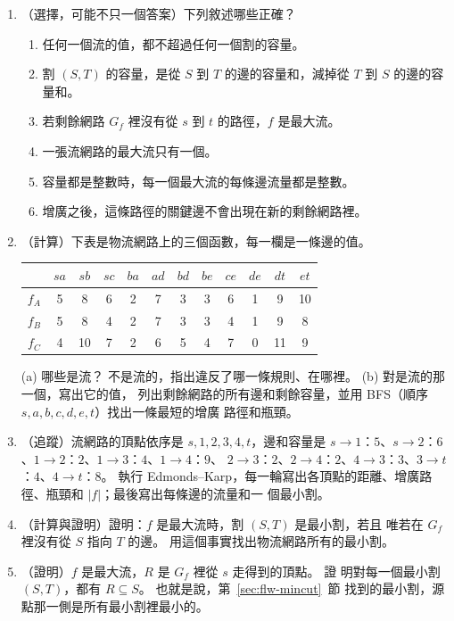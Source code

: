 \begin{enumerate}
\item \label{q:flw-tf}（選擇，可能不只一個答案）下列敘述哪些正確？
\begin{enumerate}
\item 任何一個流的值，都不超過任何一個割的容量。
\item 割 $(S, T)$ 的容量，是從 $S$ 到 $T$ 的邊的容量和，減掉從 $T$ 到 $S$ 的邊的容量和。
\item 若剩餘網路 $G_f$ 裡沒有從 $s$ 到 $t$ 的路徑，$f$ 是最大流。
\item 一張流網路的最大流只有一個。
\item 容量都是整數時，每一個最大流的每條邊流量都是整數。
\item 增廣之後，這條路徑的關鍵邊不會出現在新的剩餘網路裡。
\end{enumerate}

\item \label{q:flw-check}（計算）下表是物流網路上的三個函數，每一欄是一條邊的值。
\begin{center}
\small
\begin{tabular}{c|ccccccccccc}
 & $sa$ & $sb$ & $sc$ & $ba$ & $ad$ & $bd$ & $be$ & $ce$ & $de$ & $dt$ & $et$ \\
\hline
$f_A$ & 5 & 8 & 6 & 2 & 7 & 3 & 3 & 6 & 1 & 9 & 10 \\
$f_B$ & 5 & 8 & 4 & 2 & 7 & 3 & 3 & 4 & 1 & 9 & 8 \\
$f_C$ & 4 & 10 & 7 & 2 & 6 & 5 & 4 & 7 & 0 & 11 & 9 \\
\end{tabular}
\end{center}
(a) 哪些是流？ 不是流的，指出違反了哪一條規則、在哪裡。 (b) 對是流的那一個，寫出它的值，
列出剩餘網路的所有邊和剩餘容量，並用 BFS（順序 $s, a, b, c, d, e, t$）找出一條最短的增廣
路徑和瓶頸。

\item \label{q:flw-trace}（追蹤）流網路的頂點依序是 $s, 1, 2, 3, 4, t$，邊和容量是
$s \to 1$：$5$、$s \to 2$：$6$、$1 \to 2$：$2$、$1 \to 3$：$4$、$1 \to 4$：$9$、
$2 \to 3$：$2$、$2 \to 4$：$2$、$4 \to 3$：$3$、$3 \to t$：$4$、$4 \to t$：$8$。 執行
Edmonds--Karp，每一輪寫出各頂點的距離、增廣路徑、瓶頸和 $|f|$；最後寫出每條邊的流量和一
個最小割。

\item \label{q:flw-allcuts}（計算與證明）證明：$f$ 是最大流時，割 $(S, T)$ 是最小割，若且
唯若在 $G_f$ 裡沒有從 $S$ 指向 $T$ 的邊。 用這個事實找出物流網路所有的最小割。

\item \label{q:flw-smallest}（證明）$f$ 是最大流，$R$ 是 $G_f$ 裡從 $s$ 走得到的頂點。 證
明對每一個最小割 $(S, T)$，都有 $R \subseteq S$。 也就是說，第~\ref{sec:flw-mincut}~節
找到的最小割，源點那一側是所有最小割裡最小的。


\end{enumerate}
